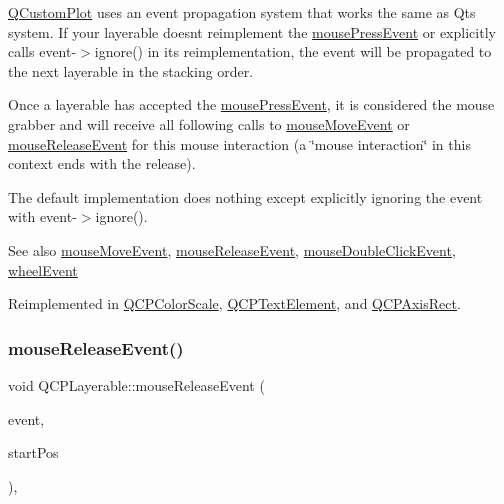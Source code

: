 \mbox{\hyperlink{class_q_custom_plot}{Q\+Custom\+Plot}} uses an event propagation system that works the same as Qt\textquotesingle{}s system. If your layerable doesn\textquotesingle{}t reimplement the \mbox{\hyperlink{class_q_c_p_layerable_af6567604818db90f4fd52822f8bc8376}{mouse\+Press\+Event}} or explicitly calls {\ttfamily event-\/$>$ignore()} in its reimplementation, the event will be propagated to the next layerable in the stacking order.

Once a layerable has accepted the \mbox{\hyperlink{class_q_c_p_layerable_af6567604818db90f4fd52822f8bc8376}{mouse\+Press\+Event}}, it is considered the mouse grabber and will receive all following calls to \mbox{\hyperlink{class_q_c_p_layerable_a9eee1ba47fd69be111059ca3881933e4}{mouse\+Move\+Event}} or \mbox{\hyperlink{class_q_c_p_layerable_aa0d79b005686f668622bbe66ac03ba2c}{mouse\+Release\+Event}} for this mouse interaction (a \char`\"{}mouse interaction\char`\"{} in this context ends with the release).

The default implementation does nothing except explicitly ignoring the event with {\ttfamily event-\/$>$ignore()}.

\begin{DoxySeeAlso}{See also}
\mbox{\hyperlink{class_q_c_p_layerable_a9eee1ba47fd69be111059ca3881933e4}{mouse\+Move\+Event}}, \mbox{\hyperlink{class_q_c_p_layerable_aa0d79b005686f668622bbe66ac03ba2c}{mouse\+Release\+Event}}, \mbox{\hyperlink{class_q_c_p_layerable_a4171e2e823aca242dd0279f00ed2de81}{mouse\+Double\+Click\+Event}}, \mbox{\hyperlink{class_q_c_p_layerable_a47dfd7b8fd99c08ca54e09c362b6f022}{wheel\+Event}} 
\end{DoxySeeAlso}


Reimplemented in \mbox{\hyperlink{class_q_c_p_color_scale_a91f633b97ffcd57fdf8cd814974c20e6}{Q\+C\+P\+Color\+Scale}}, \mbox{\hyperlink{class_q_c_p_text_element_ad7b2c98355e3d2f912574b74fcee0574}{Q\+C\+P\+Text\+Element}}, and \mbox{\hyperlink{class_q_c_p_axis_rect_aa9a7c807eaa4666870ac94aa6abc4dde}{Q\+C\+P\+Axis\+Rect}}.

\mbox{\label{class_q_c_p_layerable_aa0d79b005686f668622bbe66ac03ba2c}} 
\subsubsection{\texorpdfstring{mouse\+Release\+Event()}{mouseReleaseEvent()}}
{\footnotesize\ttfamily void Q\+C\+P\+Layerable\+::mouse\+Release\+Event (\begin{DoxyParamCaption}\item[{Q\+Mouse\+Event $\ast$}]{event,  }\item[{const Q\+PointF \&}]{start\+Pos }\end{DoxyParamCaption})\hspace{0.3cm}{\ttfamily [protected]}, {\ttfamily [virtual]}}

